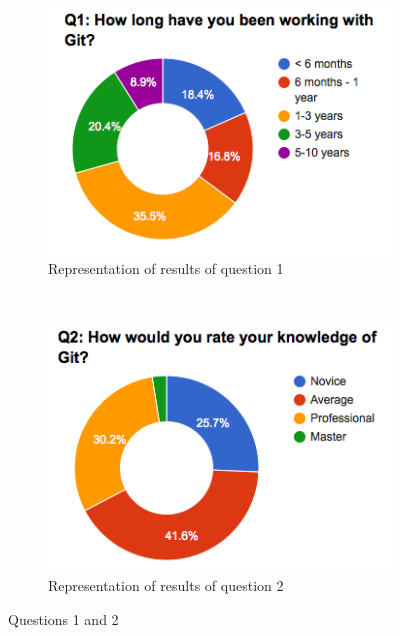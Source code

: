 \documentclass[a4paper,oneside]{bth} %
\begin{document}
			\begin{figure}[H]
				\centering
				\begin{subfigure}[b]{0.45\textwidth}
					\includegraphics[width=\textwidth]{graphs/q1.png}
					\caption{Representation of results of question 1}
					\label{fig:q1}
				\end{subfigure}
				~
				\begin{subfigure}[b]{0.45\textwidth}
					\includegraphics[width=\textwidth]{graphs/q2.png}
					\caption{Representation of results of question 2}
					\label{fig:q2}
				\end{subfigure}
				\caption{Questions 1 and 2}\label{fig:q1-q2}
			\end{figure}
\end{document}
